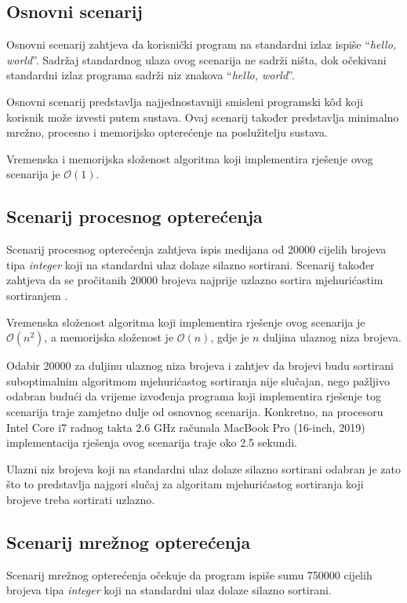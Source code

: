 \documentclass[times, utf8, diplomski]{fer}
\begin{document}
\subsection{Osnovni scenarij}
Osnovni scenarij zahtjeva da korisnički program na standardni izlaz ispiše ``\textit{hello, world}''. Sadržaj standardnog ulaza ovog scenarija ne sadrži ništa, dok očekivani standardni izlaz programa sadrži niz znakova ``\textit{hello, world}''.

Osnovni scenarij predstavlja najjednostavniji smisleni programski kôd koji korisnik može izvesti putem sustava. Ovaj scenarij također predstavlja minimalno mrežno, procesno i memorijsko opterećenje na poslužitelju sustava.

Vremenska i memorijska složenost algoritma koji implementira rješenje ovog scenarija je $\mathcal{O}(1)$.

\subsection{Scenarij procesnog opterećenja}
Scenarij procesnog opterećenja zahtjeva ispis medijana od 20000 cijelih brojeva tipa \textit{integer} koji na standardni ulaz dolaze silazno sortirani. Scenarij također zahtjeva da se pročitanih 20000 brojeva najprije uzlazno sortira mjehurićastim sortiranjem .

Vremenska složenost algoritma koji implementira rješenje ovog scenarija je $\mathcal{O}(n^2)$, a memorijska složenost je $\mathcal{O}(n)$, gdje je $n$ duljina ulaznog niza brojeva.

Odabir 20000 za duljinu ulaznog niza brojeva i zahtjev da brojevi budu sortirani suboptimalnim algoritmom mjehurićastog sortiranja nije slučajan, nego pažljivo odabran budući da vrijeme izvođenja programa koji implementira rješenje tog scenarija traje zamjetno dulje od osnovnog scenarija. Konkretno, na procesoru Intel Core i7 radnog takta 2.6 GHz računala MacBook Pro (16-inch, 2019)  implementacija rješenja ovog scenarija traje oko 2.5 sekundi.

Ulazni niz brojeva koji na standardni ulaz dolaze silazno sortirani odabran je zato što to predstavlja najgori slučaj  za algoritam mjehurićastog sortiranja koji brojeve treba sortirati uzlazno.

\subsection{Scenarij mrežnog opterećenja}
Scenarij mrežnog opterećenja očekuje da program ispiše sumu 750000 cijelih brojeva tipa \textit{integer} koji na standardni ulaz dolaze silazno sortirani.
\end{document}
